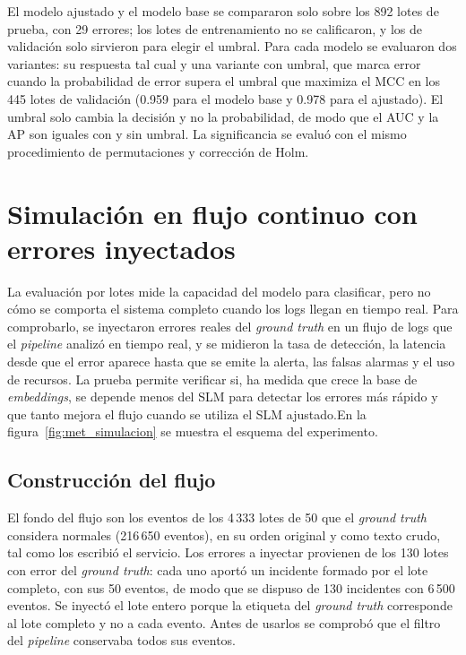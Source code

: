 El modelo ajustado y el modelo base se compararon solo sobre los 892 lotes de prueba, con 29 errores; los lotes de entrenamiento no se calificaron, y los de validación solo sirvieron para elegir el umbral. Para cada modelo se evaluaron dos variantes: su respuesta tal cual y una variante con umbral, que marca error cuando la probabilidad de error supera el umbral que maximiza el MCC en los 445 lotes de validación (0.959 para el modelo base y 0.978 para el ajustado). El umbral solo cambia la decisión y no la probabilidad, de modo que el AUC y la AP son iguales con y sin umbral. La significancia se evaluó con el mismo procedimiento de permutaciones y corrección de Holm.

\section{Simulación en flujo continuo con errores inyectados}\label{sec:met_simulacion}\label{sec:met_inyeccion}

La evaluación por lotes mide la capacidad del modelo para clasificar, pero no cómo se comporta el sistema completo cuando los logs llegan en tiempo real. Para comprobarlo, se inyectaron errores reales del \textit{ground truth} en un flujo de logs que el \textit{pipeline} analizó en tiempo real, y se midieron la tasa de detección, la latencia desde que el error aparece hasta que se emite la alerta, las falsas alarmas y el uso de recursos. La prueba permite verificar si, ha medida que crece la base de \textit{embeddings}, se depende menos del SLM para detectar los errores más rápido y que tanto mejora el flujo cuando se utiliza el SLM ajustado.En la figura~\ref{fig:met_simulacion} se muestra el esquema del experimento.


\subsection{Construcción del flujo}

El fondo del flujo son los eventos de los 4\,333 lotes de 50 que el \textit{ground truth} considera normales (216\,650 eventos), en su orden original y como texto crudo, tal como los escribió el servicio. Los errores a inyectar provienen de los 130 lotes con error del \textit{ground truth}: cada uno aportó un incidente formado por el lote completo, con sus 50 eventos, de modo que se dispuso de 130 incidentes con 6\,500 eventos. Se inyectó el lote entero porque la etiqueta del \textit{ground truth} corresponde al lote completo y no a cada evento. Antes de usarlos se comprobó que el filtro del \textit{pipeline} conservaba todos sus eventos.

